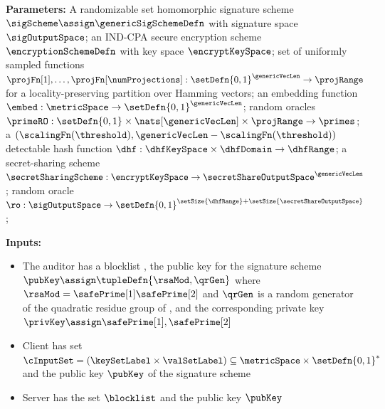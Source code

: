 \iffalse

\setcounter{auditorLineNmbr}{0}
\setcounter{clientLineNmbr}{0}
\setcounter{serverLineNmbr}{0}


\begin{mdframed}[frametitle={Delegated Fuzzy PSI}, frametitlealignment=\centering, 
	font=\small]
	
	\smallskip\noindent\textbf{Parameters:} A randomizable set homomorphic signature scheme 
	$\sigScheme \assign \genericSigSchemeDefn$ with signature space $\sigOutputSpace$; an 
	IND-CPA secure encryption scheme $\encryptionSchemeDefn$ with key space 
	$\encryptKeySpace$; set of uniformly sampled functions $\projFn[1], \dots, 
	\projFn[\numProjections]: \setDefn{0,1}^{\genericVecLen} \rightarrow \projRange$ for a 
	locality-preserving partition over Hamming vectors; an embedding function 
	$\embed: \metricSpace \rightarrow \setDefn{0,1}^{\genericVecLen}$; 
	random oracles $\primeRO: 
	\setDefn{0,1} \times \nats[\genericVecLen] \times \projRange \rightarrow \primes$;  
	a $(\scalingFn(\threshold), \genericVecLen - \scalingFn(\threshold))$ detectable hash 
	function $\dhf: \dhfKeySpace \times \dhfDomain \rightarrow \dhfRange$;
	a secret-sharing scheme $\secretSharingScheme: \encryptKeySpace \rightarrow 
	\secretShareOutputSpace^{\genericVecLen}$; random oracle $\ro: 
	\sigOutputSpace \rightarrow \setDefn{0,1}^{\setSize{\dhfRange} + 
		\setSize{\secretShareOutputSpace}}$;
	
	\smallskip\noindent\textbf{Inputs:}
	\begin{itemize}[leftmargin=0.5em]
		\item The auditor \auditor has a blocklist \blocklist, the public key for the signature scheme 
		$\pubKey \assign \tupleDefn{\rsaMod, \qrGen}$ where $\rsaMod = \safePrime[1] \safePrime[2]$ 
		and $\qrGen$ is a random generator of the quadratic residue group \qrGroup of 
		\integersModNInv , and the corresponding private key $\privKey \assign \safePrime[1], 
		\safePrime[2]$  
		\item 	Client has set $\cInputSet = (\keySetLabel \times \valSetLabel) \subseteq \metricSpace 
		\times \setDefn{0,1}^{\ast}$ and the public key $\pubKey$ of the signature scheme
		\item Server has the set $\blocklist$ and the public key $\pubKey$ 	
	\end{itemize}
	

\end{mdframed}
